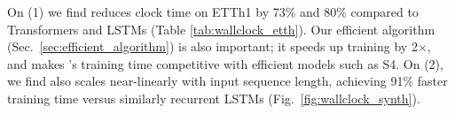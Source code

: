 





On (1) we find \ourmethod{} reduces clock time on ETTh1 by 73\% and 80\% compared to Transformers and LSTMs (Table \ref{tab:wallclock_etth}). Our efficient algorithm (Sec.~\ref{sec:efficient_algorithm}) is also important; it speeds up training by 2$\times$, and makes \ourmethod{}'s training time competitive with efficient models such as S4. On (2), we find \ourmethod{} also scales near-linearly with input sequence length, 
achieving 91\% faster training time versus similarly recurrent LSTMs (Fig.~\ref{fig:wallclock_synth}).




